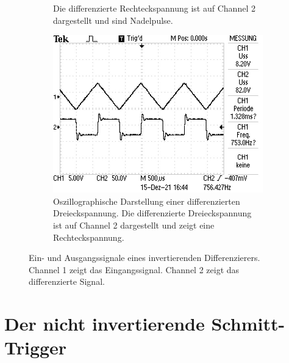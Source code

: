 \begin{figure}
\begin{subfigure}[b]{0.45\textwidth}
{        Die differenzierte Rechteckspannung ist auf Channel 2 dargestellt und sind Nadelpulse.}
        \label{fig:diff_recht}
    \end{subfigure}
    \newline
    \newline  
    \newline
    \newline  
    \newline  
    \begin{subfigure}{0.45\textwidth}
        \centering
        \includegraphics[width=\textwidth]{data_of_others_cuz_ours_suck/diff/diff dreieck.JPG}
        \caption{Oszillographische Darstellung einer differenzierten Dreieckspannung.
        Die differenzierte Dreieckspannung ist auf Channel 2 dargestellt und zeigt eine Rechteckspannung.}
        \label{fig:diff_drei}
    \end{subfigure}
       \caption{Ein- und Ausgangssignale eines invertierenden Differenzierers. Channel 1 zeigt
       das Eingangssignal. Channel 2 zeigt das differenzierte Signal.}
       \label{fig:diff}
\end{figure}
\FloatBarrier

\section{Der nicht invertierende Schmitt-Trigger}

%
